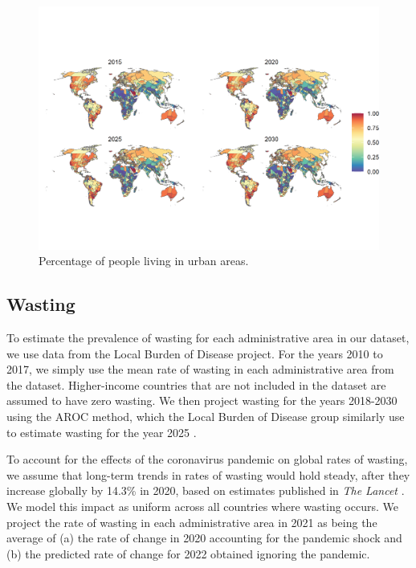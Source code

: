 \documentclass{article}
\begin{document}
\begin{figure}[H]
  \centering
  \includegraphics[width=\linewidth]{img/covars/urban_perc.png}
  \caption{Percentage of people living in urban areas.}
\end{figure}

\pagebreak
\subsection{Wasting}
To estimate the prevalence of wasting for each administrative area in our dataset, we use data from the Local Burden of Disease project.  For the years 2010 to 2017, we simply use the mean rate of wasting in each administrative area from the dataset.  Higher-income countries that are not included in the dataset are assumed to have zero wasting.  We then project wasting for the years 2018-2030 using the AROC method, which the Local Burden of Disease group similarly use to estimate wasting for the year 2025 \citep{Local2020}.

To account for the effects of the coronavirus pandemic on global rates of wasting, we assume that long-term trends in rates of wasting would hold steady, after they increase globally by 14.3\% in 2020, based on estimates published in \textit{The Lancet} \citep{headey2020impacts}.  We model this impact as uniform across all countries where wasting occurs.  We project the rate of wasting in each administrative area in 2021 as being the average of (a) the rate of change in 2020 accounting for the pandemic shock and (b) the predicted rate of change for 2022 obtained ignoring the pandemic.
\end{document}
